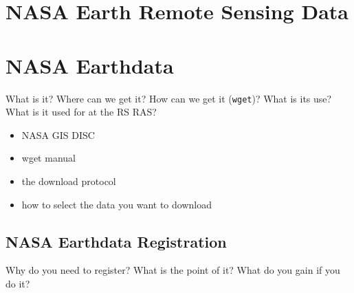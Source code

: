 \documentclass[../00_main.tex]{subfiles}
\begin{document}
\section{NASA Earth Remote Sensing Data}

\section{NASA Earthdata}

What is it? Where can we get it? How can we get it (\texttt{wget})? What is its
use? What is it used for at the RS RAS?
\begin{itemize}
    \item NASA GIS DISC
    \item wget manual
    \item the download protocol
    \item how to select the data you want to download
\end{itemize}

\subsection{NASA Earthdata Registration}

Why do you need to register? What is the point of it? What do you gain if you
do it?
\end{document}
